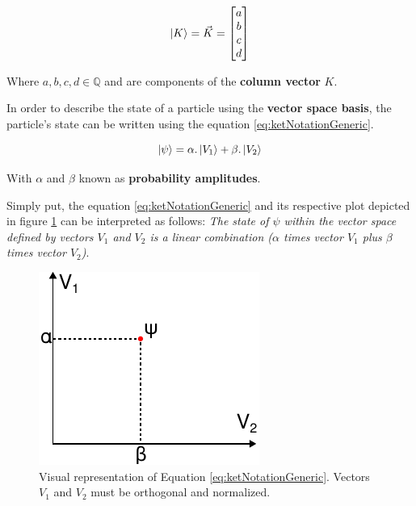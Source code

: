 			\begin{equation}
				\ket{K} = \vec{K} = \begin{bmatrix}
					a \\
					b \\
					c \\
					d
				\end{bmatrix}
				\label{eq:ketNotationVector}
			\end{equation}
			
			\par Where $a, b, c, d \in \mathbb{Q}$ and are components of the \textbf{column vector} $K$.\newline

			\par In order to describe the state of a particle using the \textbf{vector space basis}, the particle's state can be written using the equation \ref{eq:ketNotationGeneric}.
			
			\begin{equation}
				\ket{\psi} = \alpha . \ket{V_1} + \beta . \ket{V_2}
				\label{eq:ketNotationGeneric}
			\end{equation}
		
			\par With $\alpha$ and $\beta$ known as \textbf{probability amplitudes}.\newline
						
			\par Simply put, the equation \ref{eq:ketNotationGeneric} and its respective plot depicted in figure \ref{fig:diracPlot} can be interpreted as follows: \textit{The state of $\psi$ within the vector space defined by vectors $V_1$ and $V_2$ is a linear combination ($\alpha$ times vector $V_1$ plus $\beta$ times vector $V_2$)}.
			
			\begin{figure}[h]
				\centering
				\includegraphics{images/diracPlot}
				\caption{Visual representation of Equation \ref{eq:ketNotationGeneric}. Vectors $V_1$ and $V_2$ must be orthogonal and normalized.}
				\label{fig:diracPlot}
			\end{figure}
	
